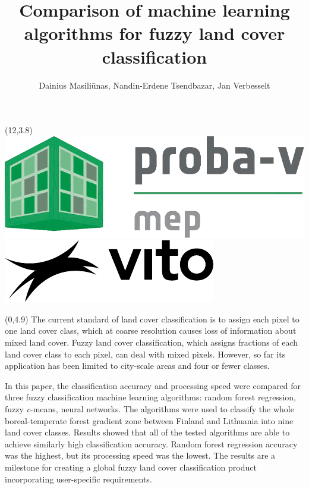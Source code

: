 \documentclass[20pt]{beamer}
\title{Comparison of machine learning algorithms for fuzzy land cover classification}
\author{Dainius Masiliūnas, Nandin-Erdene Tsendbazar, Jan Verbesselt}
\begin{document}
  \beamertemplatenavigationsymbolsempty
  \begin{frame}{} 

	\begin{textblock}{15}(12,3.8)
		\includegraphics[height=0.5\TPVertModule]{figures/PVMEP.png} \hskip 1cm
		\includegraphics[height=0.5\TPVertModule]{figures/vito-black}
	\end{textblock}

	\begin{textblock}{7}(0,4.9)
	  \Line
	  The current standard of land cover classification is to assign each pixel to one land cover class, which at coarse resolution causes loss of information about mixed land cover. Fuzzy land cover classification, which assigns fractions of each land cover class to each pixel, can deal with mixed pixels. However, so far its application has been limited to city-scale areas and four or fewer classes.
	  
	  In this paper, the classification accuracy and processing speed were compared for three fuzzy classification machine learning algorithms: random forest regression, fuzzy \textit{c}-means, neural networks. The algorithms were used to classify the whole boreal-temperate forest gradient zone between Finland and Lithuania into nine land cover classes. Results showed that all of the tested algorithms are able to achieve similarly high classification accuracy. Random forest regression accuracy was the highest, but its processing speed was the lowest. The results are a milestone for creating a global fuzzy land cover classification product incorporating user-specific requirements.
	
	\end{textblock}
	

\end{frame}
\end{document}
